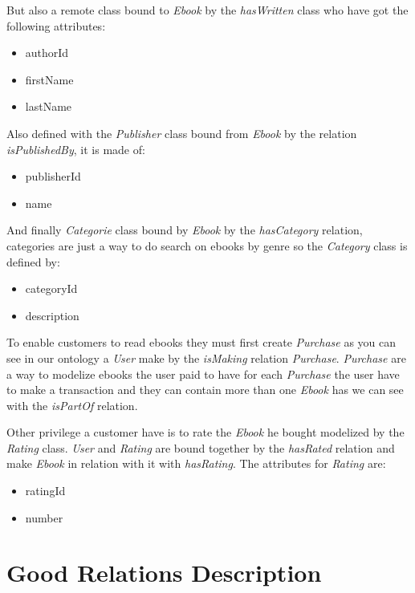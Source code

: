 \documentclass[a4paper,11pt]{article}
\begin{document}
But also a remote  class bound to \emph{Ebook} by the \emph{hasWritten} class who have got the
following attributes:

\begin{itemize}
  \item authorId
  \item firstName
  \item lastName
\end{itemize}

Also defined with the \emph{Publisher} class bound from \emph{Ebook} by the relation \emph{isPublishedBy},
it is made of:

\begin{itemize}
  \item publisherId
  \item name
\end{itemize}

And finally \emph{Categorie} class bound by \emph{Ebook} by the \emph{hasCategory} relation, categories are just
a way to do search on ebooks by genre so the \emph{Category} class is defined by:

\begin{itemize}
  \item categoryId
  \item description
\end{itemize}

To enable customers to read ebooks they must first create \emph{Purchase} as you can see in our ontology a \emph{User}
make by the \emph{isMaking} relation \emph{Purchase}. \emph{Purchase} are a way to modelize ebooks the user paid to have
for each \emph{Purchase} the user have to make a transaction and they can contain more than one \emph{Ebook} has we can
see with the \emph{isPartOf} relation.

Other privilege a customer have is to rate the \emph{Ebook} he bought modelized by the \emph{Rating} class.
\emph{User} and \emph{Rating} are bound together by the \emph{hasRated} relation and make \emph{Ebook} in relation
with it with \emph{hasRating}. The attributes for \emph{Rating} are:

\begin{itemize}
  \item ratingId
  \item number
\end{itemize}

\section{Good Relations Description}
\end{document}
